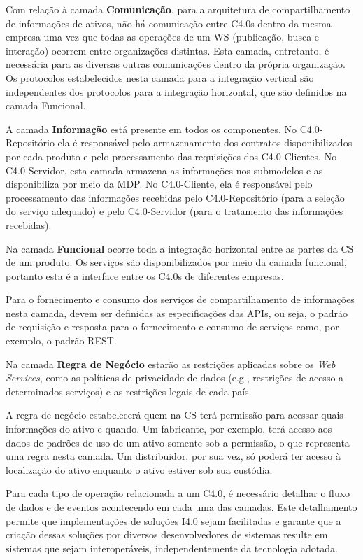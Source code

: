 Com relação à camada \textbf{Comunicação}, para a arquitetura de compartilhamento de informações de ativos, não há comunicação entre C4.0s dentro da mesma empresa uma vez que todas as operações de um WS (publicação, busca e interação) ocorrem entre organizações distintas. Esta camada, entretanto, é necessária para as diversas outras comunicações dentro da própria organização. Os protocolos estabelecidos nesta camada para a integração vertical são independentes dos protocolos para a integração horizontal, que são definidos na camada Funcional.

A camada \textbf{Informação} está presente em todos os componentes. No C4.0-Repositório ela é responsável pelo armazenamento dos contratos disponibilizados por cada produto e pelo processamento das requisições dos C4.0-Clientes. No C4.0-Servidor, esta camada armazena as informações nos submodelos e as disponibiliza por meio da MDP. No C4.0-Cliente, ela é responsável pelo processamento das informações recebidas pelo C4.0-Repositório (para a seleção do serviço adequado) e pelo C4.0-Servidor (para o tratamento das informações recebidas).

Na camada \textbf{Funcional} ocorre toda a integração horizontal entre as partes da CS de um produto. Os serviços são disponibilizados por meio da camada funcional, portanto esta é a interface entre os C4.0s de diferentes empresas.

Para o fornecimento e consumo dos serviços de compartilhamento de informações nesta camada, devem ser definidas as especificações das APIs, ou seja, o padrão de requisição e resposta para o fornecimento e consumo de serviços como, por exemplo, o padrão REST.

Na camada \textbf{Regra de Negócio} estarão as restrições aplicadas sobre os \textit{Web Services}, como as políticas de privacidade de dados (e.g., restrições de acesso a determinados serviços) e as restrições legais de cada país.

A regra de negócio estabelecerá quem na CS terá permissão para acessar quais informações do ativo e quando. Um fabricante, por exemplo, terá acesso aos dados de padrões de uso de um ativo somente sob a permissão, o que representa uma regra nesta camada. Um distribuidor, por sua vez, só poderá ter acesso à localização do ativo enquanto o ativo estiver sob sua custódia.

Para cada tipo de operação relacionada a um C4.0, é necessário detalhar o fluxo de dados e de eventos acontecendo em cada uma das camadas. Este detalhamento permite que implementações de soluções I4.0 sejam facilitadas e garante que a criação dessas soluções por diversos desenvolvedores de sistemas resulte em sistemas que sejam interoperáveis, independentemente da tecnologia adotada.


